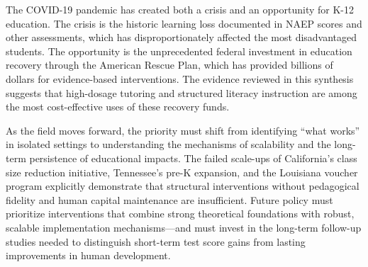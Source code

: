 \documentclass[12pt,letterpaper]{article}
\begin{document}
The COVID-19 pandemic has created both a crisis and an opportunity for K-12 education. The crisis is the historic learning loss documented in NAEP scores and other assessments, which has disproportionately affected the most disadvantaged students. The opportunity is the unprecedented federal investment in education recovery through the American Rescue Plan, which has provided billions of dollars for evidence-based interventions. The evidence reviewed in this synthesis suggests that high-dosage tutoring and structured literacy instruction are among the most cost-effective uses of these recovery funds.

As the field moves forward, the priority must shift from identifying ``what works'' in isolated settings to understanding the mechanisms of scalability and the long-term persistence of educational impacts. The failed scale-ups of California's class size reduction initiative, Tennessee's pre-K expansion, and the Louisiana voucher program explicitly demonstrate that structural interventions without pedagogical fidelity and human capital maintenance are insufficient. Future policy must prioritize interventions that combine strong theoretical foundations with robust, scalable implementation mechanisms---and must invest in the long-term follow-up studies needed to distinguish short-term test score gains from lasting improvements in human development.

\nocite{*}


\end{document}
